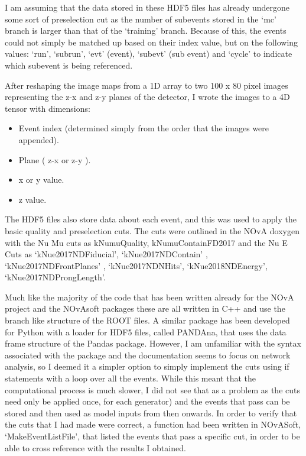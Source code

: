 \documentclass[11pt]{article}
\begin{document}
I am assuming that the data stored in these HDF5 files has already undergone some sort of preselection cut as the number of subevents stored in the ‘mc’ branch is larger than that of the ‘training’ branch. Because of this, the events could not simply be matched up based on their index value, but on the following values: ‘run’, ‘subrun’, ‘evt’ (event), ‘subevt’ (sub event) and ‘cycle’ to indicate which subevent is being referenced. 

After reshaping the image maps from a 1D array to two 100 x 80 pixel images representing the z-x and z-y planes of the detector, I wrote the images to a 4D tensor with dimensions:
{\begin{itemize}
 \vspace*{-3mm}
\item Event index (determined simply from the order that the images were appended).
 \vspace*{-3mm}
\item Plane ( z-x or z-y ).
 \vspace*{-3mm}
\item x or y value.
 \vspace*{-3mm}
\item z value.
 \vspace*{-3mm}
  \end{itemize}}
    
The HDF5 files also store data about each event, and this was used to apply the basic quality and preselection cuts. The cuts were outlined in the NOvA doxygen with the Nu Mu cuts as kNumuQuality, kNumuContainFD2017 and the Nu E Cuts as ‘kNue2017NDFiducial’,  ‘kNue2017NDContain’ , ‘kNue2017NDFrontPlanes’ , ‘kNue2017NDNHits’, ‘kNue2018NDEnergy’,  ‘kNue2017NDProngLength’.

Much like the majority of the code that has been written already for the NOvA project and the NOvAsoft packages these are all written in C++ and use the branch like structure of the ROOT files. A similar package has been developed for Python with a loader for HDF5 files, called PANDAna, that uses the data frame structure of the Pandas package. However, I am unfamiliar with the syntax associated with the package and the documentation seems to focus on network analysis, so I deemed it a simpler option to simply implement the cuts using if statements with a loop over all the events. While this meant that the computational process is much slower, I did not see that as a problem as the cuts need only be applied once, for each generator) and the events that pass can be stored and then used as model inputs from then onwards. In order to verify that the cuts that I had made were correct, a function had been written in NOvASoft, ‘MakeEventListFile’, that listed the events that pass a specific cut, in order to be able to cross reference with the results I obtained.
\end{document}

